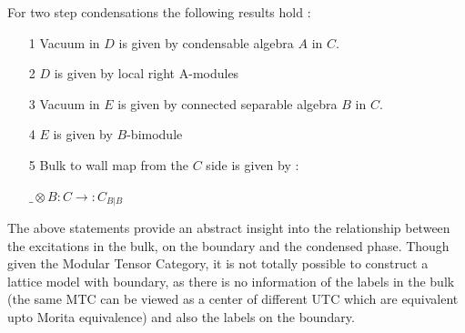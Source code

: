 For two step condensations the following results hold : \\
\begin{itemize}
\item[1] Vacuum in $D$ is given by condensable algebra $A$ in $C$. 
\item[2] $D$ is given by local right A-modules 
\item[3] Vacuum in $E$ is given by connected separable algebra $B$ in $C$. 
\item[4] $E$ is given by $B$-bimodule 
\item[5] Bulk to wall map from the $C$ side is given by :
\begin{center}
  $ \_ \otimes B : C \rightarrow : C_{B|B}$
\end{center}
\end{itemize}

The above statements provide an abstract insight into the relationship between the excitations in the bulk, on the boundary and the condensed phase. Though given the Modular Tensor Category, 
it is not totally possible to construct a lattice model with boundary, as there is no information of the labels in the bulk (the same MTC can be viewed as a center
of different UTC which are equivalent upto Morita equivalence) and also the labels on the boundary. 







